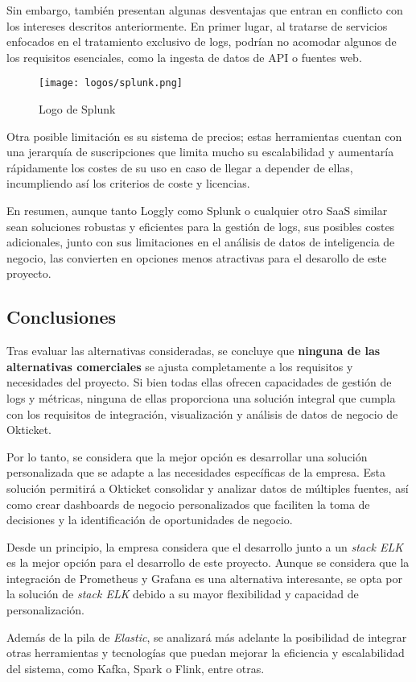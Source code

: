 Sin embargo, también presentan algunas desventajas que entran en conflicto con
los intereses descritos anteriormente. En primer lugar, al tratarse de
servicios enfocados en el tratamiento exclusivo de logs, podrían no acomodar
algunos de los requisitos esenciales, como la ingesta de datos de API o fuentes
web.

\begin{figure}[H]
	\centering
	\texttt{[image: logos/splunk.png]}
	\caption{Logo de Splunk~\textregistered}
\end{figure}

Otra posible limitación es su sistema de precios; estas herramientas cuentan con
una jerarquía de suscripciones que limita mucho su escalabilidad y aumentaría
rápidamente los costes de su uso en caso de llegar a depender de ellas,
incumpliendo así los criterios de coste y licencias.

\newpage{}
En resumen, aunque tanto Loggly como Splunk o cualquier otro SaaS similar
sean soluciones robustas y eficientes para la gestión de logs, sus posibles
costes adicionales, junto con sus limitaciones en el análisis de datos de
inteligencia de negocio, las convierten en opciones menos atractivas para el
desarollo de este proyecto.


\subsection{Conclusiones}
Tras evaluar las alternativas consideradas, se concluye que \textbf{ninguna de
las alternativas comerciales} se ajusta completamente a los requisitos y
necesidades del proyecto. Si bien todas ellas ofrecen capacidades de gestión de
logs y métricas, ninguna de ellas proporciona una solución integral que cumpla
con los requisitos de integración, visualización y análisis de datos de negocio
de Okticket.

Por lo tanto, se considera que la mejor opción es desarrollar una solución
personalizada que se adapte a las necesidades específicas de la empresa. Esta
solución permitirá a Okticket consolidar y analizar datos de múltiples fuentes,
así como crear dashboards de negocio personalizados que faciliten la toma de
decisiones y la identificación de oportunidades de negocio.

Desde un principio, la empresa considera que el desarrollo junto a un
\textit{stack ELK} es la mejor opción para el desarrollo de este proyecto.
Aunque se considera que la integración de Prometheus y Grafana es una
alternativa interesante, se opta por la solución de \textit{stack ELK} debido a
su mayor flexibilidad y capacidad de personalización.

Además de la pila de \textit{Elastic}, se analizará más adelante la posibilidad
de integrar otras herramientas y tecnologías que puedan mejorar la eficiencia y
escalabilidad del sistema, como Kafka, Spark o Flink, entre otras.
